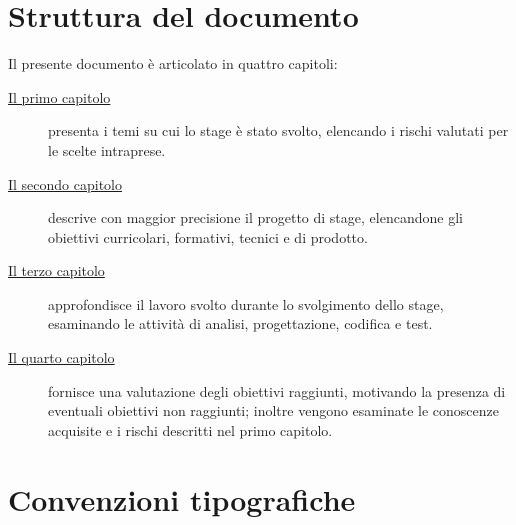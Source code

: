 
\thispagestyle{empty}

\chapter*{Struttura del documento}

Il presente documento è articolato in quattro capitoli:
\begin{description}
		\item[{\hyperref[cap:introduzione]{Il primo capitolo}}] presenta i temi su cui lo stage è stato svolto, elencando i rischi valutati per le scelte intraprese.

    \item[{\hyperref[cap:processi-metodologie]{Il secondo capitolo}}] descrive con maggior precisione il progetto di stage, elencandone gli obiettivi curricolari, formativi, tecnici e di prodotto.

    \item[{\hyperref[cap:descrizione-stage]{Il terzo capitolo}}] approfondisce il lavoro svolto durante lo svolgimento dello stage, esaminando le attività di analisi, progettazione, codifica e test.

    \item[{\hyperref[cap:analisi-requisiti]{Il quarto capitolo}}] fornisce una valutazione degli obiettivi raggiunti, motivando la presenza di eventuali obiettivi non raggiunti; inoltre vengono esaminate le conoscenze acquisite e i rischi descritti nel primo capitolo.

\end{description}

\let\clearpage\relax\chapter*{Convenzioni tipografiche}

